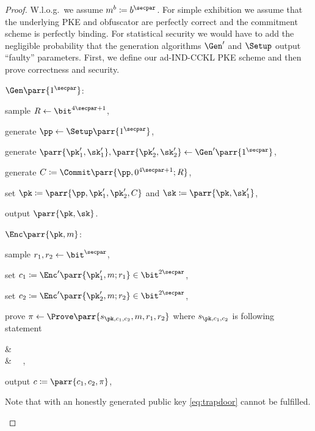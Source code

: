\begin{proof}
    W.l.o.g.\ we assume \(m^b \coloneqq b^\secpar\).
    For simple exhibition we assume that the underlying PKE and obfuscator are perfectly correct and the commitment scheme is perfectly binding.
    For statistical security we would have to add the negligible probability that the generation algorithms \(\Gen'\) and \(\Setup\) output \enquote{faulty} parameters.
    First, we define our ad-IND-CCKL PKE scheme and then prove correctness and security.
    \begin{sitemize}
        \item \(\Gen\parr{1^\secpar}\):
        \begin{sitemize}
            \item sample \(R \gets \bit^{4\secpar+1}\),
            \item generate \(\pp \gets \Setup\parr{1^{\secpar}}\),
            \item generate \(\parr{\pk'_1,\sk'_1}, \parr{\pk'_2,\sk'_2} \gets \Gen'\parr{1^{\secpar}}\),
            \item generate \(C \coloneqq \Commit\parr{\pp,0^{4\secpar+1};R}\),
            \item set \(\pk \coloneqq \parr{\pp,\pk'_1,\pk'_2,C}\) and \(\sk \coloneqq \parr{\pk,\sk'_1}\),
            \item output \(\parr{\pk,\sk}\).
        \end{sitemize}

        \item \(\Enc\parr{\pk,m}\):
        \begin{sitemize}
            \item sample \(r_1,r_2 \gets \bit^\secpar\),
            \item set \(c_1 \coloneqq \Enc'\parr{\pk'_1,m;r_1} \in \bit^{2\secpar}\),
            \item set \(c_2 \coloneqq \Enc'\parr{\pk'_2,m;r_2} \in \bit^{2\secpar}\),
            \item prove \(\pi \gets \Prove\parr{s_{\pk,c_1,c_2},m,r_1,r_2}\) where \(s_{\pk,c_1,c_2}\) is following statement
            \begin{bralign}\label{eq:consistency}
                &\ 
                \\\label{eq:trapdoor}
                \vee
                &\ 
                \ ,
            \end{bralign}
            \item output \(c \coloneqq \parr{c_1,c_2,\pi}\),
        \end{sitemize}
        Note that with an honestly generated public key \cref{eq:trapdoor} cannot be fulfilled.


\end{sitemize}
\end{proof}
